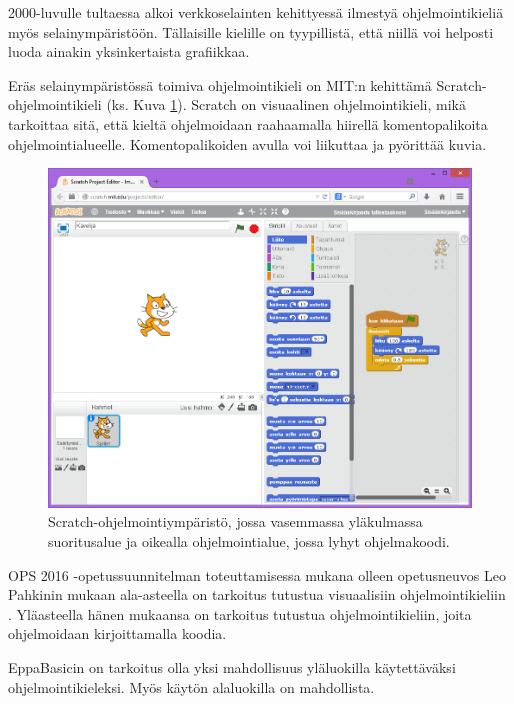 2000-luvulle tultaessa alkoi
verkkoselainten kehittyessä
ilmestyä ohjelmointikieliä
myös selainympäristöön.
Tällaisille kielille on tyypillistä,
että niillä voi helposti luoda
ainakin yksinkertaista grafiikkaa.

Eräs selainympäristössä toimiva
ohjelmointikieli on
MIT:n kehittämä
Scratch-ohjelmointikieli
\cite{scratch}
(ks. Kuva \ref{img:scratch}).
Scratch on visuaalinen ohjelmointikieli,
mikä tarkoittaa sitä, että
kieltä ohjelmoidaan raahaamalla
hiirellä komentopalikoita
ohjelmointialueelle.
Komentopalikoiden avulla
voi liikuttaa ja pyörittää
kuvia.

\begin{figure}[h]
    \centering
    \includegraphics[width=1\textwidth]{scratch}
    \caption{Scratch-ohjelmointiympäristö, jossa vasemmassa yläkulmassa suoritusalue ja oikealla ohjelmointialue, jossa lyhyt ohjelmakoodi.}
    \label{img:scratch}
\end{figure}


OPS 2016 -opetussuunnitelman
toteuttamisessa mukana olleen
opetusneuvos Leo Pahkinin mukaan
ala-asteella on tarkoitus tutustua
visuaalisiin ohjelmointikieliin
\cite{koodi2016_ops}.
Yläasteella hänen mukaansa
on tarkoitus tutustua
ohjelmointikieliin, joita
ohjelmoidaan kirjoittamalla koodia.

EppaBasicin on tarkoitus olla
yksi mahdollisuus yläluokilla
käytettäväksi ohjelmointikieleksi.
Myös käytön alaluokilla on
mahdollista.